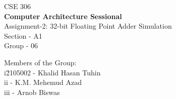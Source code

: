 \documentclass{article}
\begin{document}
\begin{center}
    \Large
    CSE 306 \\[10pt]
    \textbf{Computer Architecture Sessional} \\[40pt]
    
    \Large
    Assignment-2: 32-bit Floating Point Adder Simulation \\[40pt]
    
    \large
    Section - A1 \\[10pt]
    Group - 06 \\[80pt]

\end{center}
\begin{tabbing}
\large
{Members of the Group:} \\[20pt]
    i\hspace{1cm}\=2105002 - Khalid Hasan Tuhin \\[10pt]
    ii - K.M. Mehemud Azad \\[10pt]
    iii - Arnob Biswas \\[10pt]
\end{tabbing}
\newpage
\end{document}
